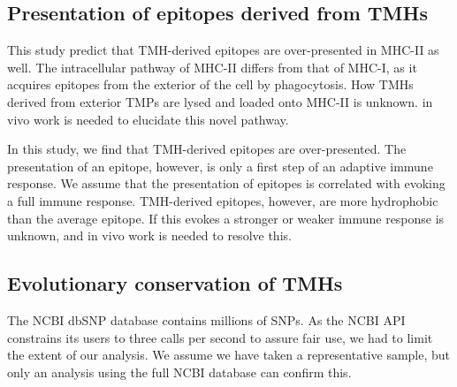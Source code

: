 \subsection{Presentation of epitopes derived from TMHs}


This study predict that TMH-derived epitopes are over-presented
in MHC-II as well. 
The intracellular pathway of MHC-II differs from that of MHC-I,
as it acquires epitopes from the exterior of the cell by phagocytosis.
How TMHs derived from exterior TMPs are lysed and loaded onto MHC-II 
is unknown. in vivo work is needed to elucidate this novel pathway.


In this study, we find that TMH-derived epitopes are over-presented.
The presentation of an epitope, however, 
is only a first step of an adaptive immune response.
We assume that the presentation of epitopes is
correlated with evoking a full immune response.
TMH-derived epitopes, however, are more hydrophobic than the average
epitope. If this evokes a stronger or weaker immune response is unknown,
and in vivo work is needed to resolve this.

\subsection{Evolutionary conservation of TMHs}


The NCBI dbSNP database contains millions of SNPs.
As the NCBI API constrains its users to three calls per second
to assure fair use, we had to limit the extent of our analysis.
We assume we have taken a representative sample, but only
an analysis using the full NCBI database can confirm this.

 
